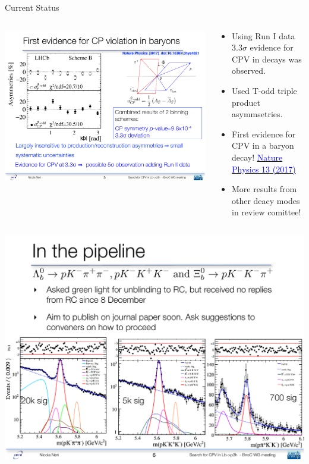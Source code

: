 \documentclass{beamer}
\begin{document}
\begin{frame}{Current Status}
  \small
  \begin{columns}
    \begin{column}{.4\textwidth}
      \includegraphics[width=\textwidth]{Run1CPV.pdf}
    \end{column}
    \begin{column}{.65\textwidth}
      \begin{itemize}
      \item Using Run I data $3.3\sigma$ evidence for CPV in \decay{\Lb}{\proton \pim\pip\pim} decays was observed.
      \item Used T-odd triple product asymmsetries.
      \item First evidence for CPV in a baryon decay! \href{http://www.nature.com/nphys/journal/v13/n4/full/nphys4021.html}{\textcolor{blue}{Nature Physics 13 (2017)}}
      \item More results from other deacy modes in review comittee!
      \end{itemize}
    \end{column}
  \end{columns}
  \begin{center}\includegraphics[width=.8\textwidth]{NewCPVChannels.pdf}\end{center}
\end{frame}
\end{document}
